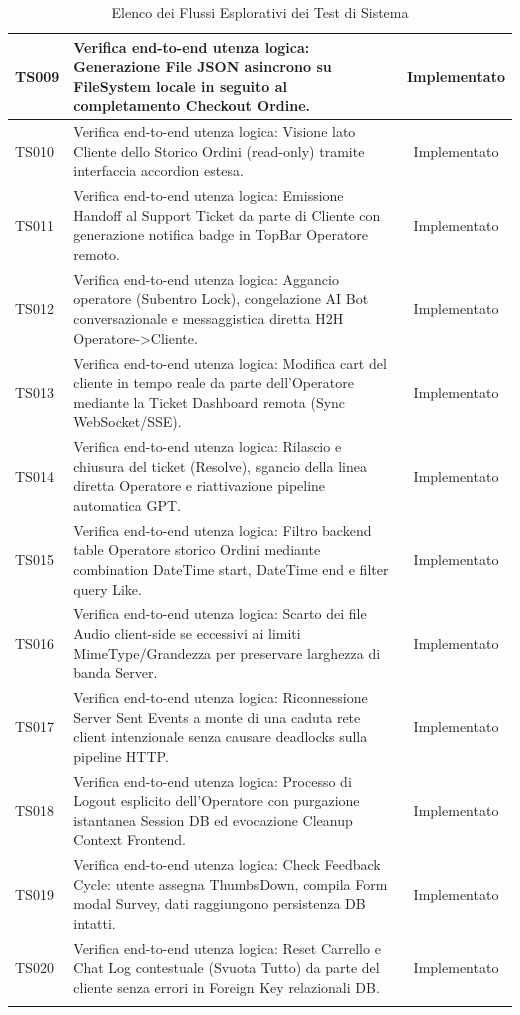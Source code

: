 \documentclass[a4paper,11pt,oneside]{scrartcl}
\begin{document}
\begin{longtable}{|p{1.9cm}|p{11.6cm}|c|}
    TS009           & Verifica end-to-end utenza logica: Generazione File JSON asincrono su FileSystem locale in seguito al completamento Checkout Ordine.                            & Implementato   \\ \hline
    TS010           & Verifica end-to-end utenza logica: Visione lato Cliente dello Storico Ordini (read-only) tramite interfaccia accordion estesa.                                  & Implementato   \\ \hline
    TS011           & Verifica end-to-end utenza logica: Emissione Handoff al Support Ticket da parte di Cliente con generazione notifica badge in TopBar Operatore remoto.           & Implementato   \\ \hline
    TS012           & Verifica end-to-end utenza logica: Aggancio operatore (Subentro Lock), congelazione AI Bot conversazionale e messaggistica diretta H2H Operatore->Cliente.      & Implementato   \\ \hline
    TS013           & Verifica end-to-end utenza logica: Modifica cart del cliente in tempo reale da parte dell'Operatore mediante la Ticket Dashboard remota (Sync WebSocket/SSE).   & Implementato   \\ \hline
    TS014           & Verifica end-to-end utenza logica: Rilascio e chiusura del ticket (Resolve), sgancio della linea diretta Operatore e riattivazione pipeline automatica GPT.     & Implementato   \\ \hline
    TS015           & Verifica end-to-end utenza logica: Filtro backend table Operatore storico Ordini mediante combination DateTime start, DateTime end e filter query Like.         & Implementato   \\ \hline
    TS016           & Verifica end-to-end utenza logica: Scarto dei file Audio client-side se eccessivi ai limiti MimeType/Grandezza per preservare larghezza di banda Server.        & Implementato   \\ \hline
    TS017           & Verifica end-to-end utenza logica: Riconnessione Server Sent Events a monte di una caduta rete client intenzionale senza causare deadlocks sulla pipeline HTTP. & Implementato   \\ \hline
    TS018           & Verifica end-to-end utenza logica: Processo di Logout esplicito dell'Operatore con purgazione istantanea Session DB ed evocazione Cleanup Context Frontend.     & Implementato   \\ \hline
    TS019           & Verifica end-to-end utenza logica: Check Feedback Cycle: utente assegna ThumbsDown, compila Form modal Survey, dati raggiungono persistenza DB intatti.         & Implementato   \\ \hline
    TS020           & Verifica end-to-end utenza logica: Reset Carrello e Chat Log contestuale (Svuota Tutto) da parte del cliente senza errori in Foreign Key relazionali DB.        & Implementato   \\ \hline
    \caption{Elenco dei Flussi Esplorativi dei Test di Sistema}
\end{longtable}
\end{document}

